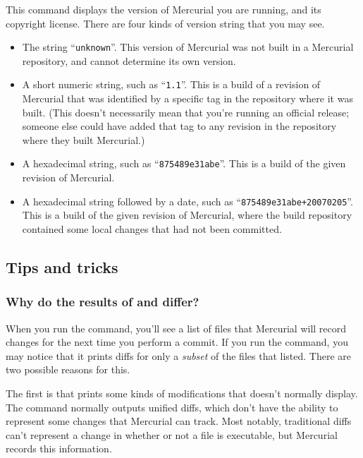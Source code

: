 This command displays the version of Mercurial you are running, and
its copyright license.  There are four kinds of version string that
you may see.
\begin{itemize}
\item The string ``\texttt{unknown}''. This version of Mercurial was
  not built in a Mercurial repository, and cannot determine its own
  version.
\item A short numeric string, such as ``\texttt{1.1}''. This is a
  build of a revision of Mercurial that was identified by a specific
  tag in the repository where it was built.  (This doesn't necessarily
  mean that you're running an official release; someone else could
  have added that tag to any revision in the repository where they
  built Mercurial.)
\item A hexadecimal string, such as ``\texttt{875489e31abe}''.  This
  is a build of the given revision of Mercurial.
\item A hexadecimal string followed by a date, such as
  ``\texttt{875489e31abe+20070205}''.  This is a build of the given
  revision of Mercurial, where the build repository contained some
  local changes that had not been committed.
\end{itemize}

\subsection{Tips and tricks}

\subsubsection{Why do the results of  and  differ?}
\label{cmdref:diff-vs-status}

When you run the  command, you'll see a list of files
that Mercurial will record changes for the next time you perform a
commit.  If you run the  command, you may notice that it
prints diffs for only a \emph{subset} of the files that 
listed.  There are two possible reasons for this.

The first is that  prints some kinds of modifications
that  doesn't normally display.  The  command
normally outputs unified diffs, which don't have the ability to
represent some changes that Mercurial can track.  Most notably,
traditional diffs can't represent a change in whether or not a file is
executable, but Mercurial records this information.

